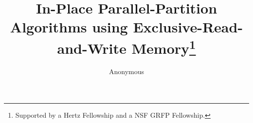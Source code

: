 \documentclass[twoside,leqno,twocolumn]{article}
\begin{document}
\title{\Large In-Place Parallel-Partition Algorithms using
Exclusive-Read-and-Write Memory\thanks{Supported by a Hertz
Fellowship and a NSF GRFP Fellowship.}}
\author{Anonymous}

\date{}

\maketitle





\end{document}
